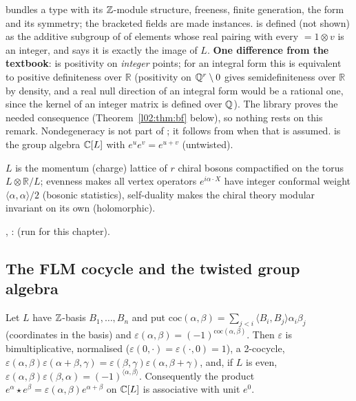 \begin{dictionary}
 bundles a type with its ${\mathbb{Z}}$-module structure, freeness, finite generation, the
form and its symmetry; the bracketed fields are made instances.  is defined (not shown) as
the additive subgroup of  of elements whose real pairing with every
 $= 1\otimes v$ is an integer, and  says it is exactly the image of $L$.
\textbf{One difference from the textbook}:  is positivity on \emph{integer} points; for an
integral form this is equivalent to positive definiteness over $\mathbb{R}$ (positivity on ${\mathbb{Q}}^r\setminus0$
gives semidefiniteness over $\mathbb{R}$ by density, and a real null direction of an integral form would be
a rational one, since the kernel of an integer matrix is defined over ${\mathbb{Q}}$). The library proves the
needed consequence (Theorem~\ref{l02:thm:bf} below), so nothing rests on this remark. Nondegeneracy is
not part of ; it follows from  when that is assumed.
 is the group algebra ${\mathbb{C}}[L]$ with $e^ue^v = e^{u+v}$ (untwisted).
\end{dictionary}

\begin{physics}
$L$ is the momentum (charge) lattice of $r$ chiral bosons compactified on the torus
$L\otimes\mathbb{R}/L$; evenness makes all vertex operators $e^{i\alpha\cdot X}$ have integer conformal weight
$\langle\alpha,\alpha\rangle/2$ (bosonic statistics), self-duality makes the chiral theory modular invariant on its
own (holomorphic).
\end{physics}

\begin{status}
\allowbreak{}\allowbreak{}\allowbreak{}, \allowbreak{}\allowbreak{}:  (run for this chapter).
\end{status}

\subsection{The FLM cocycle and the twisted group algebra}

\begin{theorem}\label{l02:thm:cocycle}
Let $L$ have ${\mathbb{Z}}$-basis $B_1,\dots,B_n$ and put
$\mathrm{coc}(\alpha,\beta) = \sum_{j<i}\langle B_i,B_j\rangle\alpha_i\beta_j$ (coordinates in the basis) and
$\varepsilon(\alpha,\beta) = (-1)^{\mathrm{coc}(\alpha,\beta)}$. Then $\varepsilon$ is bimultiplicative, normalised
($\varepsilon(0,\cdot) = \varepsilon(\cdot,0) = 1$), a 2-cocycle,
$\varepsilon(\alpha,\beta)\varepsilon(\alpha+\beta,\gamma) = \varepsilon(\beta,\gamma)\varepsilon(\alpha,\beta+\gamma)$, and, if $L$ is
even, $\varepsilon(\alpha,\beta)\varepsilon(\beta,\alpha) = (-1)^{\langle\alpha,\beta\rangle}$. Consequently the product
$e^\alpha\star e^\beta = \varepsilon(\alpha,\beta)e^{\alpha+\beta}$ on ${\mathbb{C}}[L]$ is associative with unit $e^0$.
\end{theorem}

